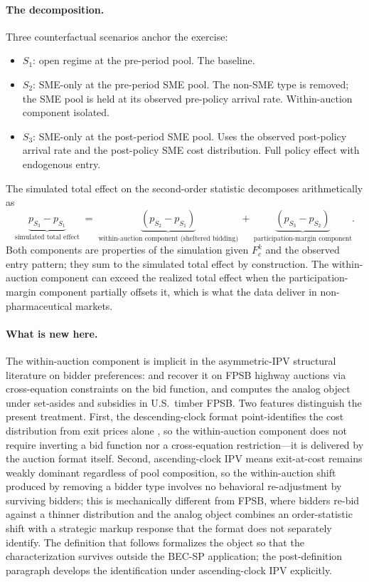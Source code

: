 \paragraph{The decomposition.} Three counterfactual scenarios anchor the exercise:
\begin{itemize}
\item $S_1$: open regime at the pre-period pool. The baseline.
\item $S_2$: SME-only at the pre-period SME pool. The non-SME type is removed; the SME pool is held at its observed pre-policy arrival rate. Within-auction component isolated.
\item $S_3$: SME-only at the post-period SME pool. Uses the observed post-policy arrival rate and the post-policy SME cost distribution. Full policy effect with endogenous entry.
\end{itemize}
The simulated total effect on the second-order statistic decomposes arithmetically as
\begin{equation}
\underbrace{p_{S_3} - p_{S_1}}_{\text{simulated total effect}}
\;=\; \underbrace{(p_{S_2} - p_{S_1})}_{\text{within-auction component (sheltered bidding)}}
   \,+\, \underbrace{(p_{S_3} - p_{S_2})}_{\text{participation-margin component}}.
\end{equation}
Both components are properties of the simulation given $F_c^k$ and the observed entry pattern; they sum to the simulated total effect by construction. The within-auction component can exceed the realized total effect when the participation-margin component partially offsets it, which is what the data deliver in non-pharmaceutical markets.

\paragraph{What is new here.} The within-auction component is implicit in the asymmetric-IPV structural literature on bidder preferences: \citet{krasnokutskaya2011} and \citet{krasnokutskayaseim2011} recover it on FPSB highway auctions via cross-equation constraints on the bid function, and \citet{athey2013} computes the analog object under set-asides and subsidies in U.S.\ timber FPSB. Two features distinguish the present treatment. First, the descending-clock format point-identifies the cost distribution from exit prices alone \citep{haile2003}, so the within-auction component does not require inverting a bid function nor a cross-equation restriction---it is delivered by the auction format itself. Second, ascending-clock IPV means exit-at-cost remains weakly dominant regardless of pool composition, so the within-auction shift produced by removing a bidder type involves no behavioral re-adjustment by surviving bidders; this is mechanically different from FPSB, where bidders re-bid against a thinner distribution and the analog object combines an order-statistic shift with a strategic markup response that the format does not separately identify. The definition that follows formalizes the object so that the characterization survives outside the BEC-SP application; the post-definition paragraph develops the identification under ascending-clock IPV explicitly.

